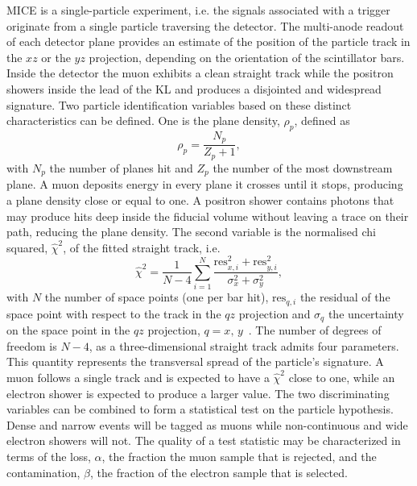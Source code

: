 MICE is a single-particle experiment, i.e. the signals associated with a trigger originate from a single particle traversing the detector. The multi-anode readout of each detector plane provides an estimate of the position of the particle track in the $xz$ or the $yz$ projection, depending on the orientation of the scintillator bars.
Inside the detector the muon exhibits a clean straight track while the positron showers inside the lead of the KL and produces a disjointed and widespread signature. 
Two particle identification variables based on these distinct characteristics can be defined. One is the plane density, $\rho_p$, defined as
\begin{equation}
\rho_p = \frac{N_p}{Z_p+1},
\end{equation}
with $N_p$ the number of planes hit and $Z_p$ the number of the most downstream plane. A muon deposits energy in every plane it crosses until it stops, producing a plane density close or equal to one. A positron shower contains photons that may produce hits deep inside the fiducial volume without leaving a trace on their path, reducing the plane density. The second variable is the normalised chi squared, $\hat{\chi}^2$, of the fitted straight track, i.e.
\begin{equation}
\hat{\chi}^2=\frac{1}{N-4}\sum_{i=1}^{N}\frac{\text{res}_{x,i}^2+\text{res}_{y,i}^2}{\sigma_x^2+\sigma_y^2},
\end{equation}
with $N$ the number of space points (one per bar hit), $\text{res}_{q,i}$ the residual of the space point with respect to the track in the $qz$ projection and $\sigma_q$ the uncertainty on the space point in the $qz$ projection, $q=x,\,y$~\cite{Drielsma:thesis}. The number of degrees of freedom is $N-4$, as a three-dimensional straight track admits four parameters. This quantity represents the transversal spread of the particle's signature. A muon follows a single track and is expected to have a $\hat{\chi}^2$ close to one, while an electron shower is expected to produce a larger value.
The two discriminating variables can be combined to form a statistical test on the particle hypothesis.
Dense and narrow events will be tagged as muons while non-continuous and wide electron showers will not. 
The quality of a test statistic may be characterized in terms of the loss, $\alpha$, the fraction the muon sample that is rejected, and the contamination, $\beta$, the fraction of the electron sample that is selected.

